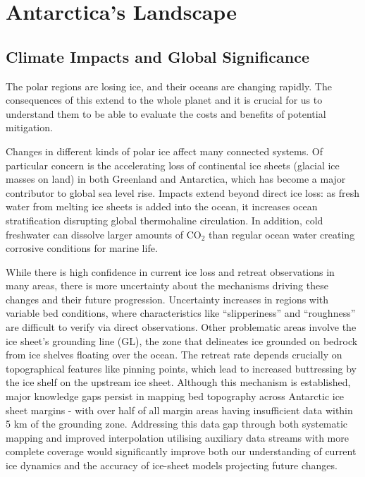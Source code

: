 \chapter{Antarctica's Landscape}\label{why}
\section{Climate Impacts and Global Significance}

The polar regions are losing ice, and their oceans are changing rapidly\cite{O_C_in_changingClimate}. The consequences of this extend to the whole planet and it is crucial for us to understand them to be able to evaluate the costs and benefits of potential mitigation. 

Changes in different kinds of polar ice affect many connected systems. Of particular concern is the accelerating loss of continental ice sheets (glacial ice masses on land) in both Greenland and Antarctica, which has become a major contributor to global sea level rise\cite{O_C_in_changingClimate}. Impacts extend beyond direct ice loss: as fresh water from melting ice sheets is added into the ocean, it increases ocean stratification disrupting global thermohaline circulation\cite{Jacobs_2004}. In addition, cold freshwater can dissolve larger amounts of $\mathrm{CO_2}$ than regular ocean water creating corrosive conditions for marine life\cite{O_C_in_changingClimate}.
 
While there is high confidence in current ice loss and retreat observations in many areas, there is more uncertainty about the mechanisms driving these changes and their future progression\cite{Fox-Kemper_2021}. Uncertainty increases in regions with variable bed conditions, where characteristics like ``slipperiness'' and ``roughness'' are difficult to verify via direct observations. Other problematic areas involve the ice sheet's grounding line (GL), the zone that delineates ice grounded on bedrock from ice shelves floating over the ocean. The retreat rate depends crucially on topographical features like pinning points\cite{Fox-Kemper_2021}, which lead to increased buttressing by the ice shelf on the upstream ice sheet. Although this mechanism is established, major knowledge gaps persist in mapping bed topography across Antarctic ice sheet margins - with over half of all margin areas having insufficient data within 5 km of the grounding zone\cite{RINGS_2022}. Addressing this data gap through both systematic mapping and improved interpolation utilising auxiliary data streams with more complete coverage would significantly improve both our understanding of current ice dynamics and the accuracy of ice-sheet models projecting future changes.

